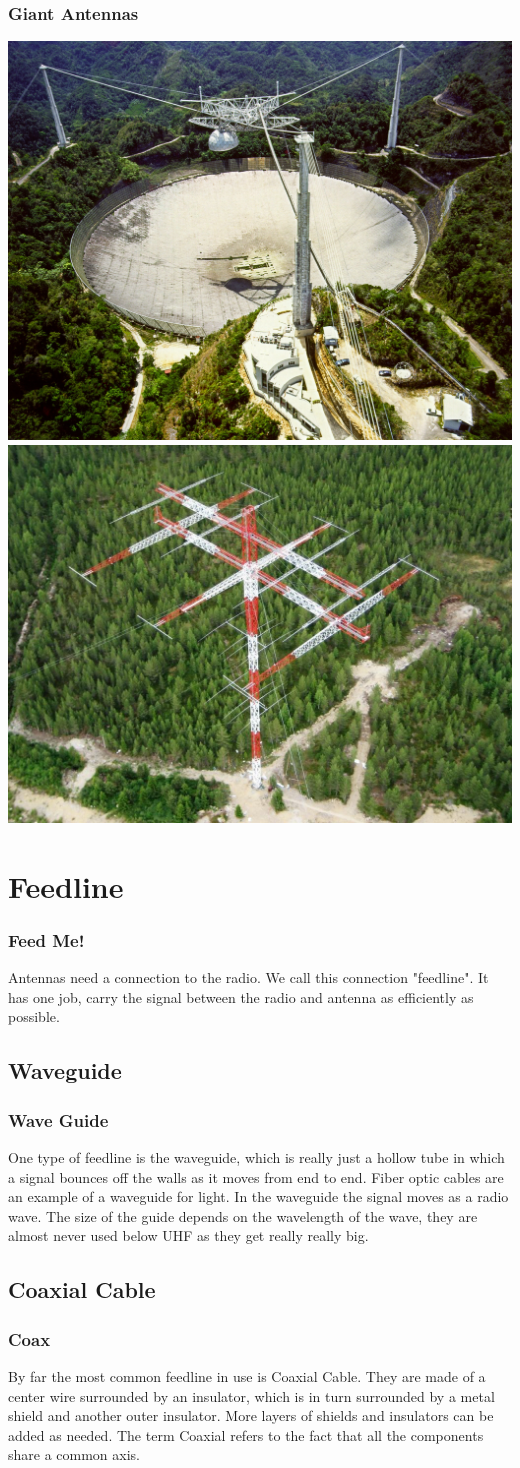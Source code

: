 \documentclass[10pt]{beamer}
\begin{document}
\begin{frame}
\frametitle{Giant Antennas}
\includegraphics[width=.49\textwidth]{arecibo.jpg}
\includegraphics[width=.49\textwidth]{160myagi.jpg}
\end{frame}

\section{Feedline}
\begin{frame}
\frametitle{Feed Me!}
Antennas need a connection to the radio. We call this connection "feedline". It has one job, carry the signal between the radio and antenna as efficiently as possible.
\end{frame}

\subsection{Waveguide}
\begin{frame}
\frametitle{Wave Guide}
One type of feedline is the waveguide, which is really just a hollow tube in which a signal bounces off the walls as it moves from end to end. Fiber optic cables are an example of a waveguide for light. In the waveguide the signal moves as a radio wave. The size of the guide depends on the wavelength of the wave, they are almost never used below UHF as they get really really big. 
\end{frame}

\subsection{Coaxial Cable}
\begin{frame}
\frametitle{Coax}
By far the most common feedline in use is Coaxial Cable. They are made of a center wire surrounded by an insulator, which is in turn surrounded by a metal shield and another outer insulator. More layers of shields and insulators can be added as needed. The term Coaxial refers to the fact that all the components share a common axis.
\end{frame}
\end{document}

